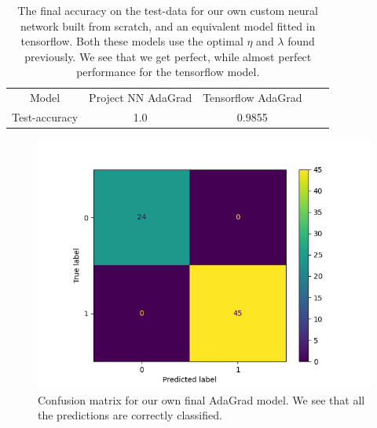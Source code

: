 \documentclass{article}
\begin{document}
\begin{table}
      \centering
      \begin{tabular}{| c | c | c | c | c |}
            Model         & Project NN AdaGrad & Tensorflow AdaGrad \\
            Test-accuracy & 1.0                & 0.9855             \\
      \end{tabular}
      \caption{The final accuracy on the test-data for our own custom neural
            network built from scratch, and an equivalent model fitted in tensorflow.
            Both these models use the optimal $\eta$ and $\lambda$ found previously.
            We see that we get perfect, while almost perfect performance for the
            tensorflow model.}
      \label{breastcancer-nn-final-results}
\end{table}


\begin{figure}
      \centering
      \includegraphics[scale=0.8]{confusion_matrix_nn}
      \caption{Confusion matrix for our own final AdaGrad model. We see that all the
            predictions are correctly classified.}
      \label{confusion-nn-final}
\end{figure}
\end{document}
